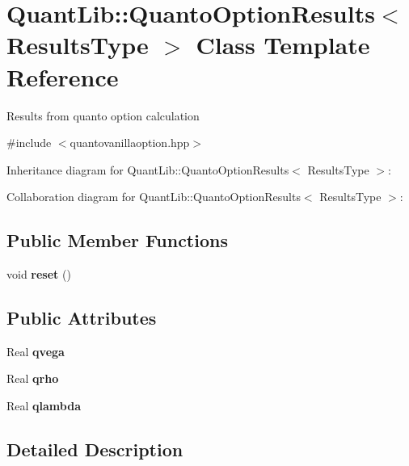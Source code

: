 \section{Quant\+Lib\+:\+:Quanto\+Option\+Results$<$ Results\+Type $>$ Class Template Reference}
\label{class_quant_lib_1_1_quanto_option_results}


Results from quanto option calculation  




{\ttfamily \#include $<$quantovanillaoption.\+hpp$>$}



Inheritance diagram for Quant\+Lib\+:\+:Quanto\+Option\+Results$<$ Results\+Type $>$\+:


Collaboration diagram for Quant\+Lib\+:\+:Quanto\+Option\+Results$<$ Results\+Type $>$\+:
\subsection*{Public Member Functions}
\begin{DoxyCompactItemize}
\item 
void {\bfseries reset} ()\label{class_quant_lib_1_1_quanto_option_results_a47bdf580af90a15e94dab577ed1cd442}

\end{DoxyCompactItemize}
\subsection*{Public Attributes}
\begin{DoxyCompactItemize}
\item 
Real {\bfseries qvega}\label{class_quant_lib_1_1_quanto_option_results_a45c09a75cb3d492f56c19d8959ee787c}

\item 
Real {\bfseries qrho}\label{class_quant_lib_1_1_quanto_option_results_a86660615c3d1555323c87b25d0f8cac1}

\item 
Real {\bfseries qlambda}\label{class_quant_lib_1_1_quanto_option_results_a8a26b473369542fc04700c9ade164a7e}

\end{DoxyCompactItemize}


\subsection{Detailed Description}
